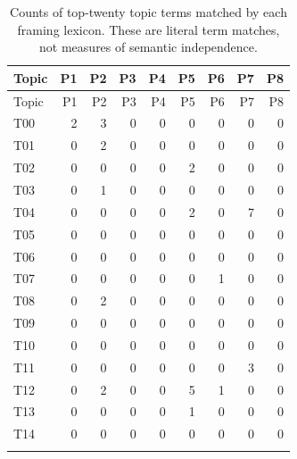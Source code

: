 \begingroup
\small
\begin{longtable}{@{}lrrrrrrrr@{}}
\caption{Counts of top-twenty topic terms matched by each framing lexicon. These are literal term matches, not measures of semantic independence.}\label{tab:overlap}\\
\toprule
Topic & P1 & P2 & P3 & P4 & P5 & P6 & P7 & P8 \\
\midrule
\endfirsthead
\toprule
Topic & P1 & P2 & P3 & P4 & P5 & P6 & P7 & P8 \\
\midrule
\endhead
\bottomrule
\endfoot
T00 & 2 & 3 & 0 & 0 & 0 & 0 & 0 & 0 \\ \addlinespace
T01 & 0 & 2 & 0 & 0 & 0 & 0 & 0 & 0 \\ \addlinespace
T02 & 0 & 0 & 0 & 0 & 2 & 0 & 0 & 0 \\ \addlinespace
T03 & 0 & 1 & 0 & 0 & 0 & 0 & 0 & 0 \\ \addlinespace
T04 & 0 & 0 & 0 & 0 & 2 & 0 & 7 & 0 \\ \addlinespace
T05 & 0 & 0 & 0 & 0 & 0 & 0 & 0 & 0 \\ \addlinespace
T06 & 0 & 0 & 0 & 0 & 0 & 0 & 0 & 0 \\ \addlinespace
T07 & 0 & 0 & 0 & 0 & 0 & 1 & 0 & 0 \\ \addlinespace
T08 & 0 & 2 & 0 & 0 & 0 & 0 & 0 & 0 \\ \addlinespace
T09 & 0 & 0 & 0 & 0 & 0 & 0 & 0 & 0 \\ \addlinespace
T10 & 0 & 0 & 0 & 0 & 0 & 0 & 0 & 0 \\ \addlinespace
T11 & 0 & 0 & 0 & 0 & 0 & 0 & 3 & 0 \\ \addlinespace
T12 & 0 & 2 & 0 & 0 & 5 & 1 & 0 & 0 \\ \addlinespace
T13 & 0 & 0 & 0 & 0 & 1 & 0 & 0 & 0 \\ \addlinespace
T14 & 0 & 0 & 0 & 0 & 0 & 0 & 0 & 0 \\ \addlinespace
\end{longtable}
\endgroup
